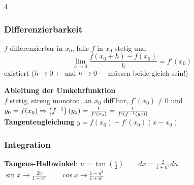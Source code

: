 \documentclass[6pt,a4paper]{scrartcl}
\newcommand{\enbrace}[1]{\ensuremath{\left(#1\right)}}
\begin{document}
\begin{multicols*}{4}
\begin{sectionbox}
		\subsubsection{Differenzierbarkeit}
		$f$ differenzierbar in $x_0$, falls $f$ in $x_0$ stetig und
		\begin{equation*}
			\lim_{h \to 0}\dfrac{f(x_0+h)-f(x_0)}{h}=f'(x_0)
		\end{equation*}
		existiert ($h \rightarrow 0+$ und $h \rightarrow 0-$ müssen beide gleich sein!)
	\end{sectionbox}
	\textbf{Ableitung der Umkehrfunktion} \\
	$f$ stetig, streng monoton, an $x_0$ diff'bar, $f'(x_0)\ne 0$ und $y_0=f(x_0) \\
		\Rightarrow \enbrace{f^{-1}}(y_0)= \frac{1}{f'(x_0)} =\frac{1}{f'(f^{-1}\enbrace{y_0})}$\\
	\textbf{Tangentengleichung} $y=f(x_0)+f'(x_0)(x-x_0)$

	\subsubsection{Integration}
	\textbf{Tangens-Halbwinkel}: $u=\tan (\frac{x}{2}) \qquad dx=\frac{2}{1+u^2}du$\\
	$\sin x \rightarrow \frac{2u}{1+u^2} \qquad \cos x \rightarrow \frac{1-u^2}{1+u^2}$


\end{multicols*}
\end{document}
